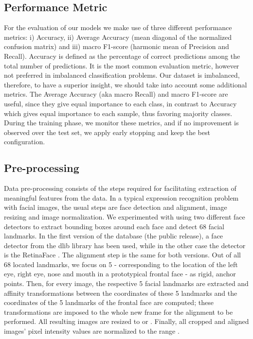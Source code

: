 \documentclass[10pt,twocolumn,letterpaper]{article}
\begin{document}
\subsection{Performance Metric}
For the evaluation of our models we make use of three different performance metrics: i) Accuracy, ii) Average Accuracy (mean diagonal of the normalized confusion matrix) and iii) macro F1-score (harmonic mean of Precision and Recall). Accuracy is defined as the percentage of correct predictions among the total number of predictions. It is the most common evaluation metric, however not preferred in imbalanced classification problems. Our dataset is imbalanced, therefore, to have a superior insight, we should take into account some additional metrics. The Average Accuracy (aka macro Recall) and macro F1-score are useful, since they give equal importance to each class, in contrast to Accuracy which  gives equal importance to each sample, thus favoring majority classes. During the training phase, we monitor these metrics, and if no improvement is observed over the test set, we apply early stopping and keep the best configuration. 


\subsection{Pre-processing}

Data pre-processing consists of the steps required for facilitating extraction of meaningful features from the data. In a typical expression recognition problem with facial images, the usual steps are face detection and alignment, image resizing and image normalization. We experimented with using two different face detectors to extract bounding boxes around each face and detect 68 facial landmarks. In the first version of the database (the public release), a face detector from the dlib library has been used, while in the other case the detector is the RetinaFace \cite{deng2020retinaface}. The alignment step is the same for both versions. Out of all 68 located landmarks, we focus on 5 - corresponding to the location of the left eye, right eye, nose and mouth in a prototypical frontal face - as rigid, anchor points. Then, for every image, the respective 5 facial landmarks are extracted and affinity transformations between the coordinates of these 5 landmarks and the coordinates of the 5 landmarks of the frontal face are computed; these transformations are imposed to the whole new frame for the alignment to be performed. All resulting images are resized to  or . Finally, all cropped and aligned images' pixel intensity values are normalized to the range .   
\end{document}
